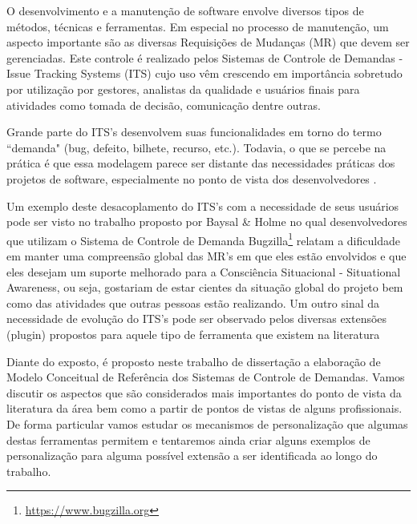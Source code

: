 \documentclass[msc,proposal,hidelot,hideabstract]{ppgccufmg} %
\begin{document}
O desenvolvimento e a manutenção de software envolve diversos tipos de métodos,
técnicas e ferramentas. Em especial no processo de manutenção, um aspecto
importante são as diversas Requisições de Mudanças (MR) que devem ser
gerenciadas. Este controle é realizado pelos Sistemas de Controle de Demandas -
Issue Tracking Systems (ITS) cujo uso vêm crescendo em importância sobretudo
por utilização por gestores, analistas da qualidade e usuários finais para
atividades como tomada de decisão, comunicação dentre outras.

Grande parte do ITS's desenvolvem suas funcionalidades em torno do termo
``demanda" (bug, defeito, bilhete, recurso, etc.). Todavia, o que se percebe na
prática é que essa modelagem parece ser distante das necessidades práticas dos projetos de software, especialmente
no ponto de vista dos desenvolvedores \cite{Baysal:2013:SAP:2486788.2486957}.

Um exemplo deste desacoplamento do ITS's com a necessidade de seus usuários
pode ser visto no trabalho proposto por Baysal \& Holme \cite{baysal2012qualitative} no qual desenvolvedores que utilizam o Sistema de
Controle de Demanda Bugzilla\footnote{\url{https://www.bugzilla.org}} relatam a
dificuldade em manter uma compreensão global das MR's em que eles estão
envolvidos e que eles desejam um suporte melhorado para a Consciência
Situacional - Situational Awareness, ou seja, gostariam de estar cientes da
situação global do projeto bem como das atividades que outras pessoas estão realizando. Um outro sinal da necessidade de evolução do
ITS's pode ser observado pelos diversas extensões (plugin) propostos para
aquele tipo de ferramenta que existem na literatura \cite{101186,Thung:2014:BIT:2635868.2661678,Thung:2014:DIT:2642937.264862,Kononenko:2014:DED:2591062.2591075}

Diante do exposto, é proposto neste  trabalho de dissertação a elaboração de Modelo Conceitual de Referência
dos Sistemas de Controle de Demandas. Vamos discutir os aspectos que são
considerados mais importantes do ponto de vista da literatura
da área bem como a partir de pontos de vistas de alguns profissionais. De forma particular vamos estudar os mecanismos de
personalização que algumas destas ferramentas permitem e tentaremos ainda criar alguns exemplos de personalização para alguma possível
extensão a ser identificada ao longo do trabalho.
\end{document}
